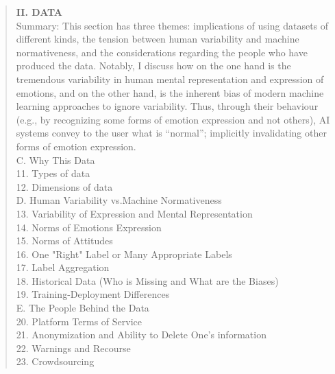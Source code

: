 \documentclass{clv3}
\begin{document}
\begin{quote}
\noindent \textbf{II. DATA}\\[5pt]
\noindent Summary: This section has three %
themes: implications of using datasets of different kinds, the tension between human variability and machine normativeness, and the  considerations regarding the people who have produced the data. Notably, I discuss how on the one hand  is the tremendous variability in human mental representation and expression of emotions, and on the other hand, is the inherent bias of modern machine learning approaches to ignore variability. Thus, through their behaviour (e.g., by recognizing some forms of emotion expression and not  others), AI systems convey to the user what is ``normal''; implicitly invalidating other forms of emotion expression.\\[5pt]
C. Why This Data\\[3pt]
\hspace*{3mm}   11. Types of data\\
\hspace*{3mm}   12. Dimensions of data\\[3pt]
D. Human Variability vs.\@ Machine Normativeness\\[3pt]
\hspace*{3mm}  13. Variability of Expression and Mental Representation\\
\hspace*{3mm}  14. Norms of Emotions Expression\\
\hspace*{3mm}  15. Norms of Attitudes\\
 \hspace*{3mm} 16. One "Right" Label or Many Appropriate Labels\\
 \hspace*{3mm} 17. Label Aggregation\\
\hspace*{3mm}  18. Historical Data (Who is Missing and What are the Biases)\\
\hspace*{3mm}  19. Training-Deployment Differences\\[3pt]
E. The People Behind the Data\\[3pt]
\hspace*{3mm}  20. Platform Terms of Service\\
\hspace*{3mm}  21. Anonymization and Ability to Delete One's information\\
\hspace*{3mm}  22. Warnings and Recourse\\
\hspace*{3mm}  23. Crowdsourcing\\[3pt]
 

\end{quote}
\end{document}
